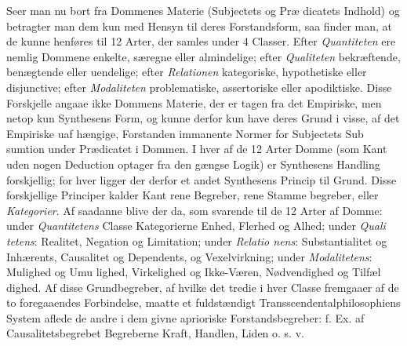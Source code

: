 \documentclass[12pt,a4paper]{book}
\begin{document}
Seer man nu bort fra Dommenes Materie (Subjectets og Præ\-%
dicatets Indhold) og betragter man dem kun med Hensyn til
deres Forstandsform, saa finder man, at de kunne henføres til
12 Arter, der samles under 4 Classer. Efter \emph{Quantiteten}
ere nemlig Dommene enkelte, særegne eller almindelige; efter
\emph{Qualiteten} bekræftende, benægtende eller uendelige; efter
\emph{Relationen} kategoriske, hypothetiske eller disjunctive; efter
\emph{Modaliteten} problematiske, assertoriske eller apodiktiske.
Disse Forskjelle angaae ikke Dommens Materie, der er tagen
fra det Empiriske, men netop kun Synthesens Form, og kunne
derfor kun have deres Grund i visse, af det Empiriske uaf\-%
hængige, Forstanden immanente Normer for Subjectets Sub\-%
sumtion under Prædicatet i Dommen. I hver af de 12 Arter
Domme (som Kant uden nogen Deduction optager fra den
gængse Logik) er Synthesens Handling forskjellig; for hver
ligger der derfor et andet Synthesens Princip til Grund. Disse
forskjellige Principer kalder Kant rene Begreber, rene Stamme\-%
begreber, eller \emph{Kategorier}. Af saadanne blive der da, som
svarende til de 12 Arter af Domme: under \emph{Quantitetens}
Classe Kategorierne Enhed, Flerhed og Alhed; under \emph{Quali\-%
tetens}: Realitet, Negation og Limitation; under \emph{Relatio\-%
nens}: Substantialitet og Inhærents, Causalitet og Dependents,
og Vexelvirkning; under \emph{Modalitetens}: Mulighed og Umu\-%
lighed, Virkelighed og Ikke-Væren, Nødvendighed og Tilfæl\-%
dighed. Af disse Grundbegreber, af hvilke det tredie i hver
Classe fremgaaer af de to foregaaendes Forbindelse, maatte
et fuldstændigt Transscendentalphilosophiens System aflede de
andre i dem givne aprioriske Forstandsbegreber: f. Ex. af
Causalitetsbegrebet Begreberne Kraft, Handlen, Liden o. s. v.
\end{document}
